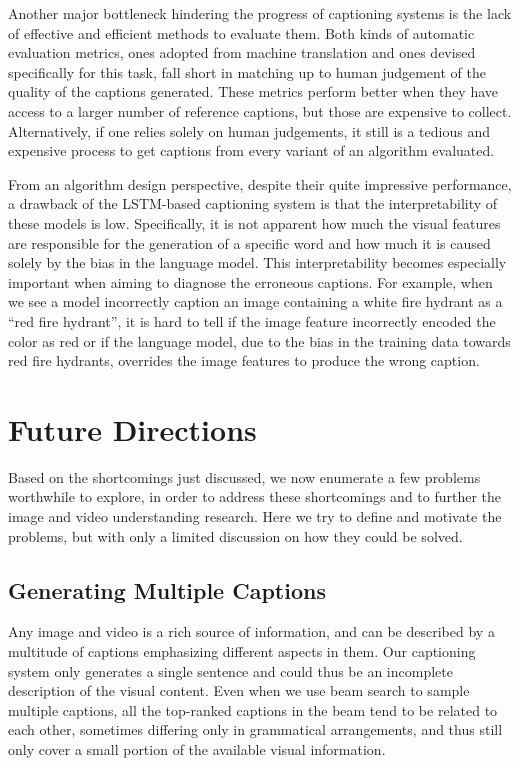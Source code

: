 Another major bottleneck hindering the progress of captioning systems is the
lack of effective and efficient methods to evaluate them.
Both kinds of automatic evaluation metrics, ones adopted from machine
translation and ones devised specifically for this task, fall short in matching
up to human judgement of the quality of the captions generated.
These metrics perform better when they have access to a larger number of
reference captions, but those are expensive to collect.
Alternatively, if one relies solely on human judgements, it still is a tedious
and expensive process to get captions from every variant of an algorithm
evaluated.

From an algorithm design perspective, despite their quite impressive
performance, a drawback of the LSTM-based captioning system is that the
interpretability of these models is low.
Specifically, it is not apparent how much the visual features are responsible
for the generation of a specific word and how much it is caused solely by the
bias in the language model.
This interpretability becomes especially important when aiming to diagnose the
erroneous captions.
For example, when we see a model incorrectly caption an image containing a white
fire hydrant as a ``red fire hydrant'', it is hard to tell if the image feature
incorrectly encoded the color as red or if the language model, due to the bias
in the training data towards red fire hydrants, overrides the image features to
produce the wrong caption.  

\section{Future Directions}
Based on the shortcomings just discussed, we now enumerate a few problems
worthwhile to explore, in order to address these shortcomings and to further the
image and video understanding research.
Here we try to define and motivate the problems, but with only a limited
discussion on how they could be solved.

\subsection{Generating Multiple Captions} Any image and video is a rich source
of information, and can be described by a multitude of captions emphasizing
different aspects in them. 
Our captioning system only generates a single sentence and could thus be an
incomplete description of the visual content.
Even when we use beam search to sample multiple captions, all the top-ranked
captions in the beam tend to be related to each other, sometimes differing only
in grammatical arrangements, and thus still only cover a small portion of the
available visual information.

